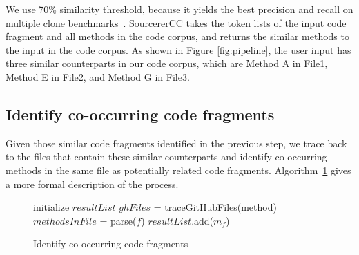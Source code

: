 We use 70\% similarity threshold, because it yields the best precision and recall on multiple clone benchmarks~\cite{sajnani2016sourcerercc}. SourcererCC takes the token lists of the input code fragment and all methods in the code corpus, and returns the similar methods to the input in the code corpus. As shown in Figure \ref{fig:pipeline}, the user input has three similar counterparts in our code corpus, which are {\ttt Method A} in {\ttt File1}, {\ttt Method E} in {\ttt File2}, and {\ttt Method G} in {\ttt File3}.

\subsection{Identify co-occurring code fragments}
Given those similar code fragments identified in the previous step, we trace back to the files that contain these similar counterparts and identify co-occurring methods in the same file as potentially related code fragments. Algorithm~\ref{alg: co-occur} gives a more formal description of the process.

\begin{figure}[h]
		
 \removelatexerror
\begin{algorithm}[H]
	\label{alg: co-occur}
	\caption{Identify co-occurring code fragments}
	initialize $resultList$\;
	{
		$ghFiles$ = traceGitHubFiles(method) \;
		{
			$methodsInFile$ = parse($f$)\;
			{
				{
					$resultList$.add($m_f$) \;
				}
			}
		} 
	}
\end{algorithm}
\end{figure}

